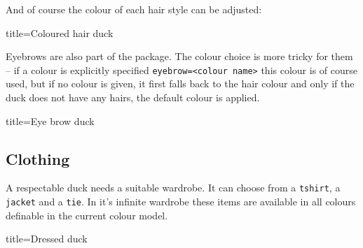 \documentclass[parskip=half]{scrartcl}
\begin{document}
And of course the colour of each hair style can be adjusted:
\begin{tcblisting}{title={Coloured hair duck}}
\begin{tikzpicture}
	\duck[longhair=teal]
\end{tikzpicture}
\end{tcblisting}

Eyebrows are also part of the package. The colour choice is more tricky for them -- if a colour is explicitly specified \lstinline|eyebrow=<colour name>| this colour is of course used, but if no colour is given, it first falls back to the hair colour and only if the duck does not have any hairs, the default colour is applied.
\begin{tcblisting}{title={Eye brow duck}}
\begin{tikzpicture}
	\duck[eyebrow]
\end{tikzpicture}
\begin{tikzpicture}
	\duck[longhair=blue, 
		eyebrow]
\end{tikzpicture}

\begin{tikzpicture}
	\duck[crazyhair=red, 
		eyebrow=blue]
\end{tikzpicture}
\end{tcblisting}

\subsection{Clothing}

A respectable duck needs a suitable wardrobe. It can choose from a \lstinline|tshirt|, a \lstinline|jacket| and a \lstinline|tie|. In it's infinite wardrobe these items are available in all colours definable in the current colour model.
\begin{tcblisting}{title={Dressed duck}}
\begin{tikzpicture}
	\duck[tshirt]
\end{tikzpicture}
\begin{tikzpicture}
	\duck[jacket]
\end{tikzpicture}

\begin{tikzpicture}
	\duck[tie]
\end{tikzpicture}
\begin{tikzpicture}
	\duck[tshirt=lightgray, 
			jacket=blue!50!black, 
			tie=blue!80!black, 
			shorthair]
\end{tikzpicture}
\end{tcblisting}
\end{document}
